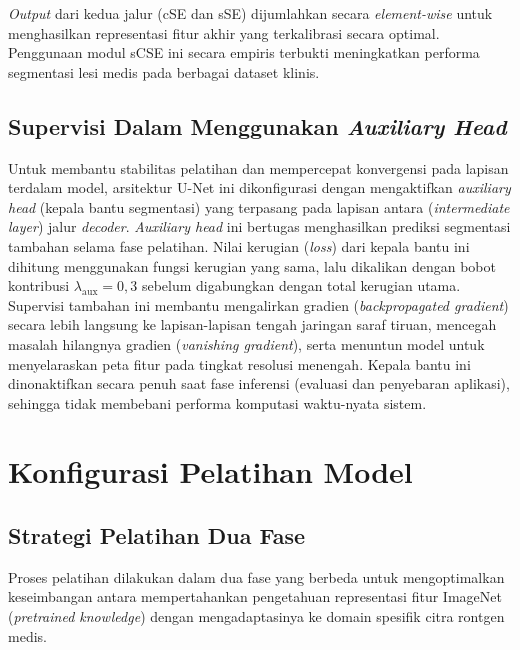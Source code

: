 \documentclass[12pt,a4paper,oneside]{book}
\begin{document}
\textit{Output} dari kedua jalur (cSE dan sSE) dijumlahkan secara \textit{element-wise} untuk menghasilkan representasi fitur akhir yang terkalibrasi secara optimal. Penggunaan modul sCSE ini secara empiris terbukti meningkatkan performa segmentasi lesi medis pada berbagai dataset klinis.

\subsection{Supervisi Dalam Menggunakan \textit{Auxiliary Head}}

Untuk membantu stabilitas pelatihan dan mempercepat konvergensi pada lapisan terdalam model, arsitektur U-Net ini dikonfigurasi dengan mengaktifkan \textit{auxiliary head} (kepala bantu segmentasi) yang terpasang pada lapisan antara (\textit{intermediate layer}) jalur \textit{decoder}. \textit{Auxiliary head} ini bertugas menghasilkan prediksi segmentasi tambahan selama fase pelatihan. Nilai kerugian (\textit{loss}) dari kepala bantu ini dihitung menggunakan fungsi kerugian yang sama, lalu dikalikan dengan bobot kontribusi $\lambda_{\text{aux}} = 0,3$ sebelum digabungkan dengan total kerugian utama. Supervisi tambahan ini membantu mengalirkan gradien (\textit{backpropagated gradient}) secara lebih langsung ke lapisan-lapisan tengah jaringan saraf tiruan, mencegah masalah hilangnya gradien (\textit{vanishing gradient}), serta menuntun model untuk menyelaraskan peta fitur pada tingkat resolusi menengah. Kepala bantu ini dinonaktifkan secara penuh saat fase inferensi (evaluasi dan penyebaran aplikasi), sehingga tidak membebani performa komputasi waktu-nyata sistem.

\section{Konfigurasi Pelatihan Model}

\subsection{Strategi Pelatihan Dua Fase}

Proses pelatihan dilakukan dalam dua fase yang berbeda untuk mengoptimalkan keseimbangan antara mempertahankan pengetahuan representasi fitur ImageNet (\textit{pretrained knowledge}) dengan mengadaptasinya ke domain spesifik citra rontgen medis.
\end{document}
